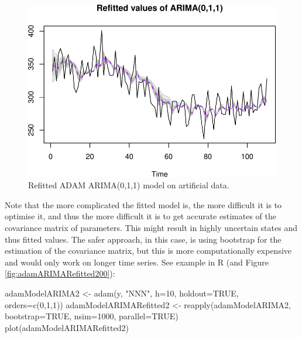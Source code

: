\documentclass[
]{book}
\newenvironment{Shaded}{\begin{snugshade}}{\end{snugshade}}
\newcommand{\AttributeTok}[1]{\textcolor[rgb]{0.77,0.63,0.00}{#1}}
\newcommand{\ConstantTok}[1]{\textcolor[rgb]{0.00,0.00,0.00}{#1}}
\newcommand{\DecValTok}[1]{\textcolor[rgb]{0.00,0.00,0.81}{#1}}
\newcommand{\FunctionTok}[1]{\textcolor[rgb]{0.00,0.00,0.00}{#1}}
\newcommand{\NormalTok}[1]{#1}
\newcommand{\OtherTok}[1]{\textcolor[rgb]{0.56,0.35,0.01}{#1}}
\newcommand{\StringTok}[1]{\textcolor[rgb]{0.31,0.60,0.02}{#1}}
\theoremstyle{definition}
\theoremstyle{definition}
\theoremstyle{definition}
\theoremstyle{definition}
\theoremstyle{remark}
\begin{document}
\begin{figure}
\centering
\includegraphics{Svetunkov--2022----ADAM_files/figure-latex/adamARIMARefitted-1.pdf}
\caption{\label{fig:adamARIMARefitted}Refitted ADAM ARIMA(0,1,1) model on artificial data.}
\end{figure}

Note that the more complicated the fitted model is, the more difficult it is to optimise it, and thus the more difficult it is to get accurate estimates of the covariance matrix of parameters. This might result in highly uncertain states and thus fitted values. The safer approach, in this case, is using bootstrap for the estimation of the covariance matrix, but this is more computationally expensive and would only work on longer time series. See example in R (and Figure \ref{fig:adamARIMARefitted200}):

\begin{Shaded}
\begin{Highlighting}[]
\NormalTok{adamModelARIMA2 }\OtherTok{\textless{}{-}} \FunctionTok{adam}\NormalTok{(y, }\StringTok{"NNN"}\NormalTok{, }\AttributeTok{h=}\DecValTok{10}\NormalTok{, }\AttributeTok{holdout=}\ConstantTok{TRUE}\NormalTok{,}
                       \AttributeTok{orders=}\FunctionTok{c}\NormalTok{(}\DecValTok{0}\NormalTok{,}\DecValTok{1}\NormalTok{,}\DecValTok{1}\NormalTok{))}
\NormalTok{adamModelARIMARefitted2 }\OtherTok{\textless{}{-}} \FunctionTok{reapply}\NormalTok{(adamModelARIMA2, }\AttributeTok{bootstrap=}\ConstantTok{TRUE}\NormalTok{,}
                                   \AttributeTok{nsim=}\DecValTok{1000}\NormalTok{, }\AttributeTok{parallel=}\ConstantTok{TRUE}\NormalTok{)}
\FunctionTok{plot}\NormalTok{(adamModelARIMARefitted2)}
\end{Highlighting}
\end{Shaded}
\end{document}
